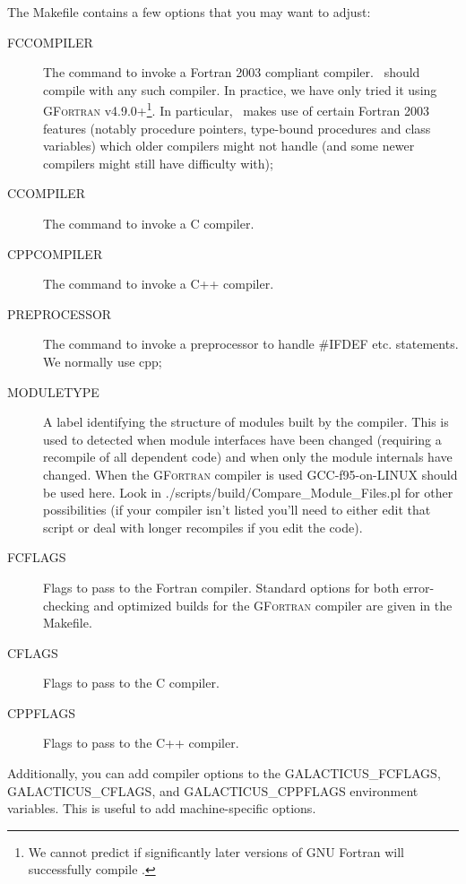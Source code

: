 The {\normalfont \ttfamily Makefile} contains a few options that you may want to adjust:
\begin{description}
 \item[{\normalfont \ttfamily FCCOMPILER}] The command to invoke a Fortran 2003 compliant compiler. \glc\ should compile with any such compiler. In practice, we have only tried it using {\normalfont \scshape GFortran} v4.9.0+\footnote{We cannot predict if significantly later versions of GNU Fortran will successfully compile \protect\glc.}. In particular, \glc\ makes use of certain Fortran 2003 features (notably procedure pointers, type-bound procedures and class variables) which older compilers might not handle (and some newer compilers might still have difficulty with);
 \item[{\normalfont \ttfamily CCOMPILER}] The command to invoke a C compiler.
 \item[{\normalfont \ttfamily CPPCOMPILER}] The command to invoke a C++ compiler.
 \item[{\normalfont \ttfamily PREPROCESSOR}] The command to invoke a preprocessor to handle {\normalfont \ttfamily \#IFDEF} etc. statements. We normally use {\normalfont \ttfamily cpp};
 \item[{\normalfont \ttfamily MODULETYPE}] A label identifying the structure of modules built by the compiler. This is used to detected when module interfaces have been changed (requiring a recompile of all dependent code) and when only the module internals have changed. When the {\normalfont \scshape GFortran} compiler is used {\normalfont \ttfamily GCC-f95-on-LINUX} should be used here. Look in {\normalfont \ttfamily ./scripts/build/Compare\_Module\_Files.pl} for other possibilities (if your compiler isn't listed you'll need to either edit that script or deal with longer recompiles if you edit the code).
 \item[{\normalfont \ttfamily FCFLAGS}] Flags to pass to the Fortran compiler. Standard options for both error-checking and optimized builds for the {\normalfont \scshape GFortran} compiler are given in the {\normalfont \ttfamily Makefile}.
 \item[{\normalfont \ttfamily CFLAGS}] Flags to pass to the C compiler.
 \item[{\normalfont \ttfamily CPPFLAGS}] Flags to pass to the C++ compiler.
\end{description}
Additionally, you can add compiler options to the {\normalfont \ttfamily GALACTICUS\_FCFLAGS}, {\normalfont \ttfamily GALACTICUS\_CFLAGS}, and {\normalfont \ttfamily GALACTICUS\_CPPFLAGS} environment variables. This is useful to add machine-specific options.

